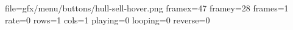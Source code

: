file=gfx/menu/buttons/hull-sell-hover.png
framex=47
framey=28
frames=1
rate=0
rows=1
cols=1
playing=0
looping=0
reverse=0